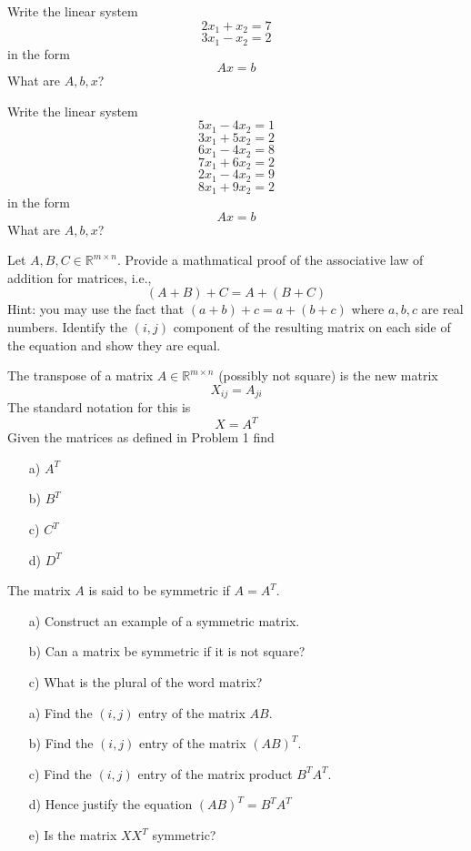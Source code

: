 \documentclass[12pt]{amsbook}
\numberwithin{equation}{section}
\theoremstyle{plain} %
\theoremstyle{definition}
\theoremstyle{remark}
\begin{document}
\begin{Exercise}
Write the linear system
$$2x_1+x_2 = 7$$
$$3x_1-x_2 = 2$$
in the form $$Ax=b$$
What  are $A, b, x$?
\end{Exercise}

\begin{Exercise}
Write the linear system
$$5x_1-4x_2 = 1$$
$$3x_1+5x_2 = 2$$
$$6x_1-4x_2 = 8$$
$$7x_1+6x_2 = 2$$
$$2x_1-4x_2 = 9$$
$$8x_1+9x_2 = 2$$
in the form $$Ax=b$$
What are $A, b, x$?
\end{Exercise}

\begin{Exercise}
Let $A, B, C \in \mathbb{R}^{m \times n}$.
Provide a mathmatical proof of the associative law of addition for matrices, i.e., 
$$(A+B)+C = A+(B+C)$$  
Hint: you may use the fact that $(a+b)+c = a +(b+c) $ where $a, b, c$ are real
numbers.  Identify the $(i,j)$ component of the resulting matrix on each side of the equation
and show they are equal.
\end{Exercise}

\begin{Exercise}
The transpose of a matrix $A \in \mathbb{R}^{m\times n}$ (possibly not square) is the new matrix
$$X_{ij} = A_{ji}$$   The standard notation for this is $$X  = A^T$$  Given the matrices as defined in
Problem 1 find
\begin{itemize}
\item[a)] $A^T$
\item[b)] $B^T$
\item[c)] $C^T$
\item[d)] $D^T$
\end{itemize}
\end{Exercise}
\begin{Exercise}
The matrix $A$ is said to be symmetric if $A = A^T$.
\begin{itemize}
\item[a)] Construct an example of a symmetric matrix.
\item[b)] Can a matrix be symmetric if it is not square?
\item[c)] What is the plural of the word matrix?
\end{itemize}
\end{Exercise}

\begin{Exercise}
\begin{itemize}
\item[a)] Find the $(i,j)$ entry of the matrix
$AB$.
\item[b)] Find the $(i,j)$ entry of the matrix $(AB)^T$.
\item[c)] Find the $(i,j)$ entry of the matrix product $B^TA^T$.
\item[d)] Hence justify the equation
$(AB)^T = B^TA^T$
\item[e)] Is the matrix $XX^T$ symmetric?
\end{itemize}
\end{Exercise}
\end{document}
